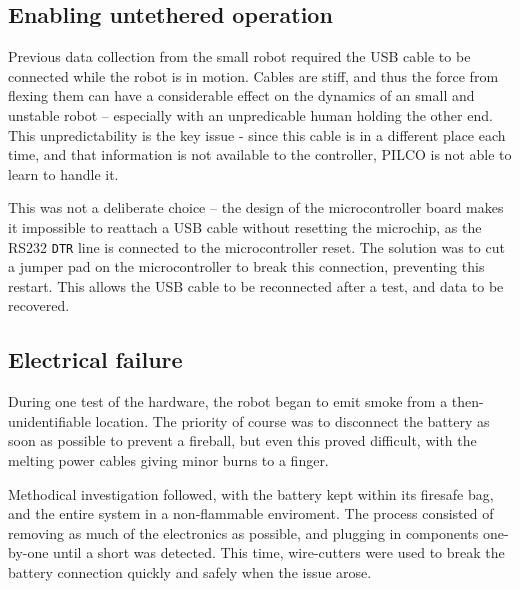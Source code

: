 \documentclass[main.tex]{subfiles}
\begin{document}
\subsection{Enabling untethered operation}
	\label{sec:untethered}

	Previous data collection from the small robot required the USB cable to be connected while the robot is in motion. Cables are stiff, and thus the force from flexing them can have a considerable effect on the dynamics of an small and unstable robot -- especially with an unpredicable human holding the other end. This unpredictability is the key issue - since this cable is in a different place each time, and that information is not available to the controller, PILCO is not able to learn to handle it.

	This was not a deliberate choice -- the design of the microcontroller board makes it impossible to reattach a USB cable without resetting the microchip, as the RS232 \texttt{DTR} line is connected to the microcontroller reset\footnotemark. The solution was to cut a jumper pad on the microcontroller to break this connection, preventing this restart. This allows the USB cable to be reconnected after a test, and data to be recovered.



\subsection{Electrical failure}

	During one test of the hardware, the robot began to emit smoke from a then-unidentifiable location. The priority of course was to disconnect the battery as soon as possible to prevent a fireball, but even this proved difficult, with the melting power cables giving minor burns to a finger.

	Methodical investigation followed, with the battery kept within its firesafe bag, and the entire system in a non-flammable enviroment. The process consisted of removing as much of the electronics as possible, and plugging in components one-by-one until a short was detected. This time, wire-cutters were used to break the battery connection quickly and safely when the issue arose.
\end{document}
